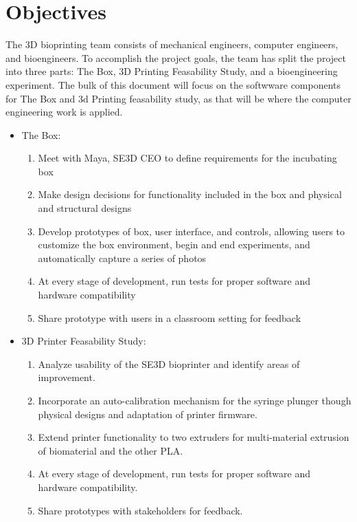 

\section{Objectives}

The 3D bioprinting team consists of mechanical engineers, computer engineers, and bioengineers. To accomplish the project goals, the team has split the project into three parts: The Box, 3D Printing Feasability Study, and a bioengineering experiment. The bulk of this document will focus on the softwware components for The Box and 3d Printing feasability study, as that will be where the computer engineering work is applied.
\begin{itemize}
	\item  The Box:\\
	\begin{enumerate}
		\item Meet with Maya, SE3D CEO to define requirements for the incubating box
		\item Make design decisions for functionality included in the box and physical and structural designs
		\item Develop prototypes of box, user interface, and controls, allowing users to customize the box environment, begin and end experiments, and automatically capture a series of photos
		\item At every stage of development, run tests for proper software and hardware compatibility
		\item Share prototype with users in a classroom setting for feedback
	\end{enumerate}
	\item 3D Printer Feasability Study:\\
	\begin{enumerate}
		\item Analyze usability of the SE3D bioprinter and identify areas of improvement.

		\item Incorporate an auto-calibration mechanism for the syringe plunger though physical designs and adaptation of printer firmware.

		\item Extend printer functionality to two extruders for multi-material extrusion of biomaterial and the other PLA.

		\item At every stage of development, run tests for proper software and hardware compatibility.

		\item Share prototypes with stakeholders for feedback.
	\end{enumerate}
\end{itemize}